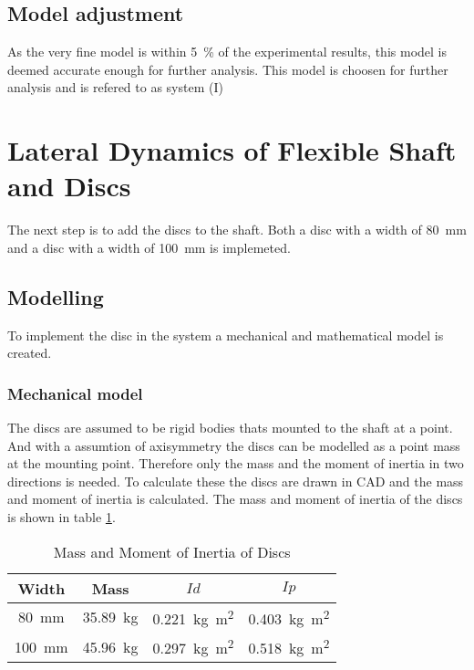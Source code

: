\subsection{Model adjustment}
As the very fine model is within \SI{5}{\percent} of the experimental results, this model is deemed accurate enough for further analysis. This model is choosen for further analysis and is refered to as system (I)

\section{Lateral Dynamics of Flexible Shaft and Discs}
The next step is to add the discs to the shaft. Both a disc with a width of \SI{80}{\milli \meter} and a disc with a width of \SI{100}{\milli \meter} is implemeted.

\subsection{Modelling}
To implement the disc in the system a mechanical and mathematical model is created.

\subsubsection{Mechanical model}
The discs are assumed to be rigid bodies thats mounted to the shaft at a point. And with a assumtion of axisymmetry the discs can be modelled as a point mass at the mounting point. Therefore only the mass and the moment of inertia in two directions is needed. To calculate these the discs are drawn in CAD and the mass and moment of inertia is calculated. The mass and moment of inertia of the discs is shown in table \ref{tab:disc_mass_moment}.
\begin{table}[htbp]
    \centering
    \caption{Mass and Moment of Inertia of Discs}
    \label{tab:disc_mass_moment}
    \begin{tabular}{@{}cccc@{}}
        \toprule
        Width    &   Mass                    &   $Id$   &   $Ip$                       \\ \midrule
        \SI{80}{\milli \meter} &  \SI{35.89}{\kilo \gram}   &   \SI{0.221}{\kilo \gram \square \meter} & \SI{0.403}{\kilo \gram \square \meter} \\ 
        \SI{100}{\milli \meter} &   \SI{45.96}{\kilo \gram}   &   \SI{0.297}{\kilo \gram \square \meter} & \SI{0.518}{\kilo \gram \square \meter}\\ \bottomrule
    \end{tabular}
\end{table}

